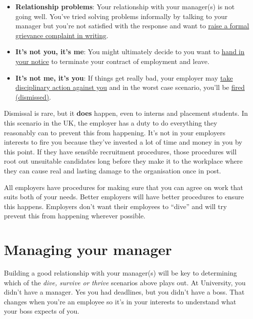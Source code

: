 \documentclass[
]{book}
\providecommand{\tightlist}{%
  \setlength{\itemsep}{0pt}\setlength{\parskip}{0pt}}
\begin{document}
\begin{itemize}
\tightlist
\item
  \textbf{Relationship problems}: Your relationship with your manager(s) is not going well. You've tried solving problems informally by talking to your manager but you're not satisfied with the response and want to \href{https://www.gov.uk/raise-grievance-at-work}{raise a formal grievance complaint in writing}. \citep{grievance}
\item
  \textbf{It's not you, it's me}: You might ultimately decide to you want to \href{https://www.gov.uk/handing-in-your-notice}{hand in your notice} to terminate your contract of employment and leave. \citep{iquit}
\item
  \textbf{It's not me, it's you}: If things get really bad, your employer may \href{https://www.gov.uk/disciplinary-procedures-and-action-at-work}{take disciplinary action against you} \citep{dive} and in the worst case scenario, you'll be \href{https://www.gov.uk/dismissal}{fired (dismissed)}. \citep{yourefired}
\end{itemize}

Dismissal is rare, but it \textbf{does} happen, even to interns and placement students. In this scenario in the UK, the employer has a duty to do everything they reasonably can to prevent this from happening. It's not in your employers interests to fire you because they've invested a lot of time and money in you by this point. If they have sensible recruitment procedures, those procedures will root out unsuitable candidates long before they make it to the workplace where they can cause real and lasting damage to the organisation once in post.

All employers have procedures for making sure that you can agree on work that suits both of your needs. Better employers will have better procedures to ensure this happens. Employers don't want their employees to ``dive'' and will try prevent this from happening wherever possible.

\hypertarget{manager}{%
\section{Managing your manager}\label{manager}}

Building a good relationship with your manager(s) will be key to determining which of the \emph{dive, survive or thrive} scenarios above plays out. At University, you didn't have a manager. Yes you had deadlines, but you didn't have a boss. That changes when you're an employee so it's in your interests to understand what your boss expects of you.
\end{document}
